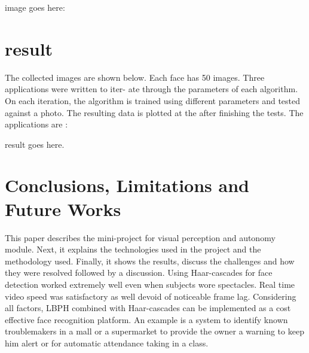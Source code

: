 \documentclass[11pt]{article}
\begin{document}
image goes here:

\section{result}
The collected images are shown below. Each face has 50 images. Three applications were written to iter- ate through the parameters of each algorithm. On each iteration, the algorithm is trained using different parameters and tested against a photo. The resulting data is plotted at the after finishing the tests. The applications are :

result goes here.
\section{Conclusions, Limitations and Future Works}
This paper describes the mini-project for visual perception and autonomy module. Next, it explains the technologies used in the project and the methodology used. Finally, it shows the results, discuss the challenges and how they were resolved followed by a discussion. Using Haar-cascades for face detection worked extremely well even when subjects wore spectacles. Real time video speed was satisfactory as well devoid of noticeable frame lag. Considering all factors, LBPH combined with Haar-cascades can be implemented as a cost effective face recognition platform. An example is a system to identify known troublemakers in a mall or a supermarket to provide the owner a warning to keep him alert or for automatic attendance taking in a class.
\end{document}
